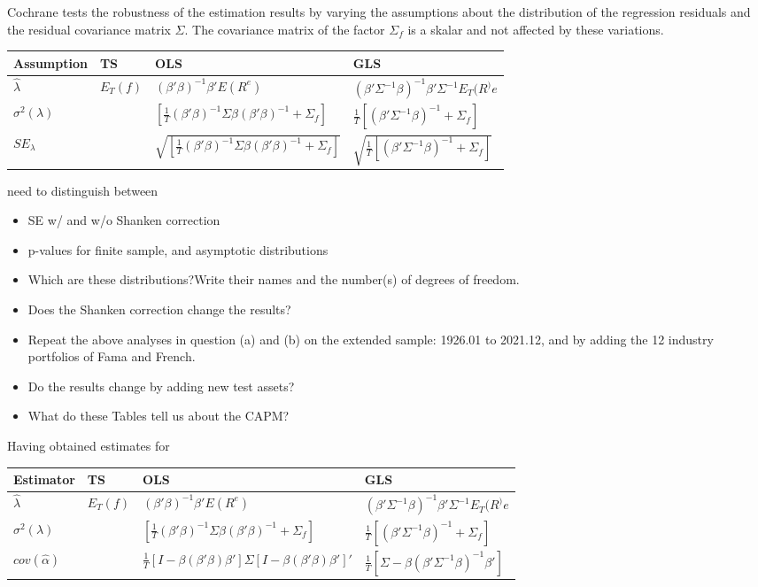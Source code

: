 \documentclass[]{article}
\begin{document}
\begin{itemize}
	Cochrane tests the robustness of the estimation results by varying the assumptions about the distribution of the regression residuals and the residual covariance matrix $\Sigma$. The covariance matrix of the factor $\Sigma_f$ is a skalar and not affected by these variations.
	
	\begin{tabular}{|l|l|l|l|}
		\hline
		Assumption & TS & OLS & GLS \\
		\hline
		$\hat{\lambda}$&$E_T(f)$&$(\beta'\beta)^{-1}\beta'E(R^e)$&$\left(\beta'\Sigma^{-1}\beta\right)^{-1}\beta'\Sigma^{-1}E_T(R^)e$\\
		$\sigma^2(\lambda)$ &  &   $\left[\frac{1}{T}(\beta'\beta)^{-1}\Sigma\beta(\beta'\beta)^{-1}+\Sigma_f\right]$  & $\frac{1}{T}\left[(\beta'\Sigma^{-1}\beta)^{-1}+\Sigma_f\right]$ \\
		$SE_{\lambda}$ &  &   $\sqrt{\left[\frac{1}{T}(\beta'\beta)^{-1}\Sigma\beta(\beta'\beta)^{-1}+\Sigma_f\right]}$  & $\sqrt{\frac{1}{T}\left[(\beta'\Sigma^{-1}\beta)^{-1}+\Sigma_f\right]}$ \\
		\hline
	\end{tabular}
	
	need to distinguish between
	\begin{itemize}
		\item SE w/ and w/o Shanken correction\\
		\item p-values for finite sample, and asymptotic distributions\\
		\item Which  are  these  distributions?Write  their names and the number(s) of degrees of freedom.
		\item Does  the  Shanken  correction  change  the  results?
		\item Repeat the above analyses in question (a) and (b) on the extended sample: 1926.01 to 2021.12, and by adding the 12 industry portfolios of Fama and French.
		\item Do the results change by adding new test assets?
		\item What do these Tables tell us about the CAPM?
		
	\end{itemize}
	
	Having obtained estimates for 
	
	\begin{tabular}{|l|l|l|l|}
		\hline
		Estimator & TS & OLS & GLS \\
		\hline
		$\hat{\lambda}$&$E_T(f)$&$(\beta'\beta)^{-1}\beta'E(R^e)$&$\left(\beta'\Sigma^{-1}\beta\right)^{-1}\beta'\Sigma^{-1}E_T(R^)e$\\
		$\sigma^2(\lambda)$ &  &   $\left[\frac{1}{T}(\beta'\beta)^{-1}\Sigma\beta(\beta'\beta)^{-1}+\Sigma_f\right]$  & $\frac{1}{T}\left[(\beta'\Sigma^{-1}\beta)^{-1}+\Sigma_f\right]$ \\
		$cov(\hat{\alpha})$&&$\frac{1}{T}\left[I-\beta(\beta'\beta)\beta'\right]\Sigma\left[I-\beta(\beta'\beta)\beta'\right]'$&$\frac{1}{T}\left[\Sigma-\beta(\beta'\Sigma^{-1}\beta)^{-1}\beta'\right]$\\
		\hline
	\end{tabular}
	
\end{itemize}
\end{document}
